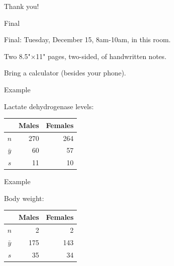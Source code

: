 \begin{frame}
    \vfill
    \centering
    {\Large
    Thank you!
    }
    \vfill
\end{frame}

\begin{frame}{Final}
  \begin{center}

      Final: Tuesday, December 15, 8am-10am, in this room.

    \vspace{2em}

      Two 8.5"$\times$11" pages, two-sided, of handwritten notes.

    \vspace{2em}

    Bring a calculator (besides your phone).

  \end{center}
\end{frame}




\begin{frame}{Example}

  Lactate dehydrogenase levels:
  \begin{center}
    \begin{tabular}{crr}
       & Males & Females \\
       \hline
       $n$ & 270 & 264 \\
       $\bar y$ & 60 & 57 \\
       $s$ & 11 & 10
     \end{tabular}

   \vspace{2em}

   \end{center}

\end{frame}



\begin{frame}{Example}

  Body weight:
  \begin{center}
    \begin{tabular}{crr}
       & Males & Females \\
       \hline
       $n$ & 2 & 2 \\
       $\bar y$ & 175 & 143 \\
       $s$ & 35 & 34
     \end{tabular}

   \vspace{2em}

   \end{center}

\end{frame}


